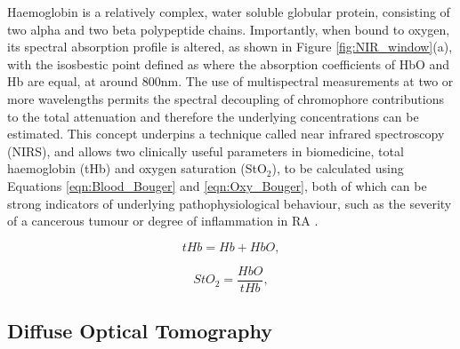 \documentclass[twoside]{bhamthesis}
\theoremstyle{definition}
\begin{document}

Haemoglobin is a relatively complex, water soluble globular protein, consisting of two alpha and two beta polypeptide chains. Importantly, when bound to oxygen, its spectral absorption profile is altered, as shown in Figure \ref{fig:NIR_window}(a), with the isosbestic point defined as where the absorption coefficients of HbO and Hb are equal, at around 800nm. The use of multispectral measurements at two or more wavelengths permits the spectral decoupling of chromophore contributions to the total attenuation and therefore the underlying concentrations can be estimated. This concept underpins a technique called near infrared spectroscopy (NIRS), and allows two clinically useful parameters in biomedicine, total haemoglobin (tHb) and oxygen saturation (StO$_2$), to be calculated using Equations \ref{eqn:Blood_Bouger} and \ref{eqn:Oxy_Bouger}, both of which can be strong indicators of underlying pathophysiological behaviour, such as the severity of a cancerous tumour \cite{harris2002hypoxia} or degree of inflammation in RA \cite{konisti2012hypoxia}.

\begin{figure}[!ht]
	\begin{minipage}{.5\textwidth}
   \begin{equation}
	tHb = Hb + HbO,
  	\label{eqn:Blood_Bouger}
    \end{equation} 
  \end{minipage}%
  \begin{minipage}{.5\textwidth}
    \begin{equation}
	StO_2 = \frac{HbO}{tHb},
  	\label{eqn:Oxy_Bouger}
    \end{equation}
  \end{minipage}
\end{figure}

\subsection{Diffuse Optical Tomography}
\end{document}
